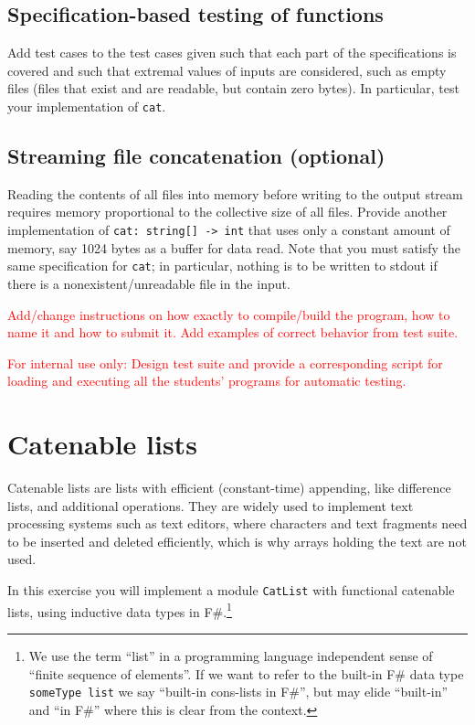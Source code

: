 \documentclass[a4paper,11pt]{article}
\newcommand{\comment}[1]{\textcolor{red}{#1}}
\begin{document}
\subsection{Specification-based testing of functions}

Add test cases to the test cases given such that each part of the specifications is covered and such that  extremal values of inputs are considered, such as empty files (files that exist and are readable, but contain zero bytes).   In particular, test your implementation of \texttt{cat}.

\subsection{Streaming file concatenation (optional)} 

Reading the contents of all files into memory before writing to the output stream requires memory proportional to the collective size of all files.  Provide another implementation of \texttt{cat: string[] -> int} that uses only a constant amount of memory, say 1024 bytes as a buffer for data read.  Note that you must satisfy the same specification for \texttt{cat}; in particular, nothing is to be written to stdout if there is a nonexistent/unreadable file in the input.

\comment{Add/change instructions on how exactly to compile/build the program, how to name it and how to submit it.  Add examples of correct behavior from test suite.}

\comment{For internal use only: Design test suite and provide a corresponding script for loading and executing all the students' programs for automatic testing.}

\section{Catenable lists}

Catenable lists are lists with efficient (constant-time) appending, like difference lists, and additional operations.  They are widely used to implement text processing systems such as text editors, where characters and text fragments need to be inserted and deleted efficiently, which is why arrays holding the text are not used.

In this exercise you will implement a module \texttt{CatList} with functional catenable lists, using inductive data types in F\#.\footnote{We use the term ``list'' in a programming language independent sense of ``finite sequence of elements''.  If we want to refer to the built-in F\# data type \texttt{someType list} we say ``built-in cons-lists in F\#'', but may elide ``built-in'' and ``in F\#'' where this is clear from the context.}
\end{document}
